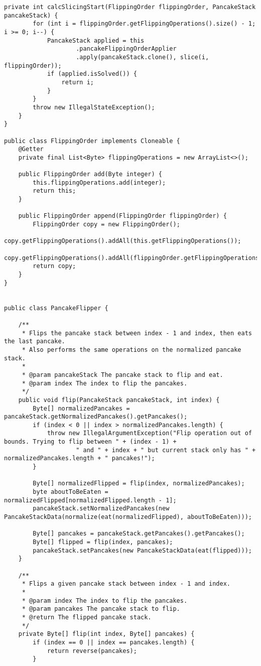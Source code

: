 \begin{lstlisting}[label={lst:source}]
    private int calcSlicingStart(FlippingOrder flippingOrder, PancakeStack pancakeStack) {
        for (int i = flippingOrder.getFlippingOperations().size() - 1; i >= 0; i--) {
            PancakeStack applied = this
                    .pancakeFlippingOrderApplier
                    .apply(pancakeStack.clone(), slice(i, flippingOrder));
            if (applied.isSolved()) {
                return i;
            }
        }
        throw new IllegalStateException();
    }
}

public class FlippingOrder implements Cloneable {
    @Getter
    private final List<Byte> flippingOperations = new ArrayList<>();

    public FlippingOrder add(Byte integer) {
        this.flippingOperations.add(integer);
        return this;
    }

    public FlippingOrder append(FlippingOrder flippingOrder) {
        FlippingOrder copy = new FlippingOrder();
        copy.getFlippingOperations().addAll(this.getFlippingOperations());
        copy.getFlippingOperations().addAll(flippingOrder.getFlippingOperations());
        return copy;
    }
}


public class PancakeFlipper {

    /**
     * Flips the pancake stack between index - 1 and index, then eats the last pancake.
     * Also performs the same operations on the normalized pancake stack.
     *
     * @param pancakeStack The pancake stack to flip and eat.
     * @param index The index to flip the pancakes.
     */
    public void flip(PancakeStack pancakeStack, int index) {
        Byte[] normalizedPancakes = pancakeStack.getNormalizedPancakes().getPancakes();
        if (index < 0 || index > normalizedPancakes.length) {
            throw new IllegalArgumentException("Flip operation out of bounds. Trying to flip between " + (index - 1) +
                    " and " + index + " but current stack only has " + normalizedPancakes.length + " pancakes!");
        }

        Byte[] normalizedFlipped = flip(index, normalizedPancakes);
        byte aboutToBeEaten = normalizedFlipped[normalizedFlipped.length - 1];
        pancakeStack.setNormalizedPancakes(new PancakeStackData(normalize(eat(normalizedFlipped), aboutToBeEaten)));

        Byte[] pancakes = pancakeStack.getPancakes().getPancakes();
        Byte[] flipped = flip(index, pancakes);
        pancakeStack.setPancakes(new PancakeStackData(eat(flipped)));
    }

    /**
     * Flips a given pancake stack between index - 1 and index.
     *
     * @param index The index to flip the pancakes.
     * @param pancakes The pancake stack to flip.
     * @return The flipped pancake stack.
     */
    private Byte[] flip(int index, Byte[] pancakes) {
        if (index == 0 || index == pancakes.length) {
            return reverse(pancakes);
        }


\end{lstlisting}

